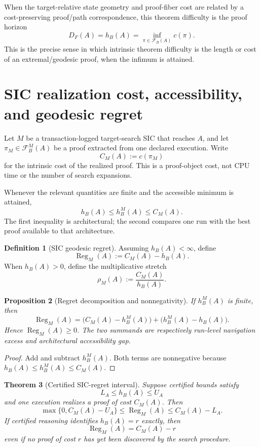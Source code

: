 \documentclass[11pt]{article}
\newtheorem{theorem}{Theorem}[section]
\newtheorem{proposition}[theorem]{Proposition}
\theoremstyle{definition}
\newtheorem{definition}[theorem]{Definition}
\newcommand{\Fib}{\mathcal F}
\newcommand{\Reg}{\operatorname{Reg}}
\begin{document}
When the target-relative state geometry and proof-fiber cost are related by a cost-preserving proof/path correspondence, this theorem difficulty is the proof horizon
\[
D_F(A)=h_B(A)=\inf_{\pi\in\Fib_B(A)}c(\pi).
\]
This is the precise sense in which intrinsic theorem difficulty is the length or cost of an extremal/geodesic proof, when the infimum is attained.

\section{SIC realization cost, accessibility, and geodesic regret}

Let $M$ be a transaction-logged target-search SIC that reaches $A$, and let $\pi_M\in\Fib_B^M(A)$ be a proof extracted from one declared execution.  Write
\[
C_M(A):=c(\pi_M)
\]
for the intrinsic cost of the realized proof.  This is a proof-object cost, not CPU time or the number of search expansions.

Whenever the relevant quantities are finite and the accessible minimum is attained,
\[
\boxed{
h_B(A)\le h_B^M(A)\le C_M(A).
}
\]
The first inequality is architectural; the second compares one run with the best proof available to that architecture.

\begin{definition}[SIC geodesic regret]
Assuming $h_B(A)<\infty$, define
\[
\boxed{\Reg_M(A):=C_M(A)-h_B(A).}
\]
When $h_B(A)>0$, define the multiplicative stretch
\[
\rho_M(A):=\frac{C_M(A)}{h_B(A)}.
\]
\end{definition}

\begin{proposition}[Regret decomposition and nonnegativity]\label{prop:sic-regret}
If $h_B^M(A)$ is finite, then
\[
\boxed{
\Reg_M(A)=\bigl(C_M(A)-h_B^M(A)\bigr)+\bigl(h_B^M(A)-h_B(A)\bigr).
}
\]
Hence $\Reg_M(A)\ge0$.  The two summands are respectively run-level navigation excess and architectural accessibility gap.
\end{proposition}

\begin{proof}
Add and subtract $h_B^M(A)$.  Both terms are nonnegative because $h_B(A)\le h_B^M(A)\le C_M(A)$.
\end{proof}

\begin{theorem}[Certified SIC-regret interval]\label{thm:sic-regret-interval}
Suppose certified bounds satisfy
\[
L_A\le h_B(A)\le U_A
\]
and one execution realizes a proof of cost $C_M(A)$.  Then
\[
\boxed{
\max\{0,C_M(A)-U_A\}
\le\Reg_M(A)\le
C_M(A)-L_A.
}
\]
If certified reasoning identifies $h_B(A)=r$ exactly, then
\[
\boxed{\Reg_M(A)=C_M(A)-r}
\]
even if no proof of cost $r$ has yet been discovered by the search procedure.
\end{theorem}
\end{document}
